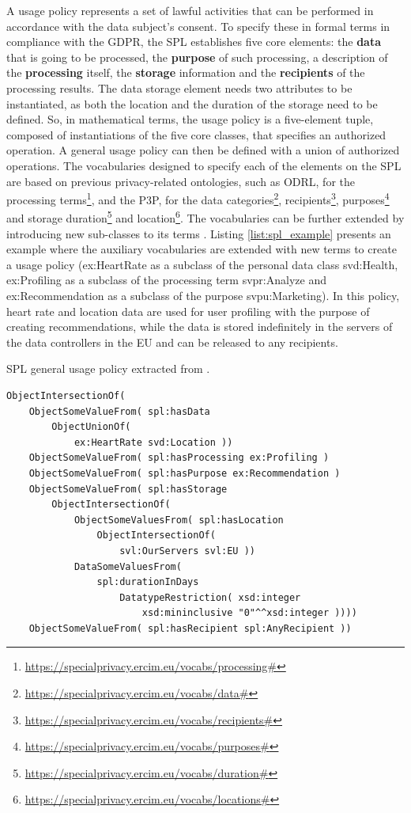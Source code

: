 A usage policy represents a set of lawful activities that can be performed in accordance with the data subject's consent.
To specify these in formal terms in compliance with the GDPR, the SPL establishes five core elements: the \textbf{data} that is going to be processed, the \textbf{purpose} of such processing, a description of the \textbf{processing} itself, the \textbf{storage} information and the \textbf{recipients} of the processing results.
The data storage element needs two attributes to be instantiated, as both the location and the duration of the storage need to be defined.
So, in mathematical terms, the usage policy is a five-element tuple, composed of instantiations of the five core classes, that specifies an authorized operation.
A general usage policy can then be defined with a union of authorized operations.
The vocabularies designed to specify each of the elements on the SPL are based on previous privacy-related ontologies, such as ODRL, for the processing terms\footnote{\url{https://specialprivacy.ercim.eu/vocabs/processing\#}}, and the P3P, for the data categories\footnote{\url{https://specialprivacy.ercim.eu/vocabs/data\#}}, recipients\footnote{\url{https://specialprivacy.ercim.eu/vocabs/recipients\#}}, purposes\footnote{\url{https://specialprivacy.ercim.eu/vocabs/purposes\#}} and storage duration\footnote{\url{https://specialprivacy.ercim.eu/vocabs/duration\#}} and location\footnote{\url{https://specialprivacy.ercim.eu/vocabs/locations\#}}.
The vocabularies can be further extended by introducing new sub-classes to its terms \citep{bonatti_policy_2018}.
Listing \ref{list:spl_example} presents an example where the auxiliary vocabularies are extended with new terms to create a usage policy (ex:HeartRate as a subclass of the personal data class svd:Health, ex:Profiling as a subclass of the processing term svpr:Analyze and ex:Recommendation as a subclass of the purpose svpu:Marketing). In this policy, heart rate and location data are used for user profiling with the purpose of creating recommendations, while the data is stored indefinitely in the servers of the data controllers in the EU and can be released to any recipients.

\begin{listing}
\caption{SPL general usage policy extracted from \cite{bonatti_special_2019}.}
\label{list:spl_example}
\begin{verbatim}
ObjectIntersectionOf(
    ObjectSomeValueFrom( spl:hasData
        ObjectUnionOf(
            ex:HeartRate svd:Location ))
    ObjectSomeValueFrom( spl:hasProcessing ex:Profiling )
    ObjectSomeValueFrom( spl:hasPurpose ex:Recommendation )
    ObjectSomeValueFrom( spl:hasStorage
        ObjectIntersectionOf(
            ObjectSomeValuesFrom( spl:hasLocation
                ObjectIntersectionOf( 
                    svl:OurServers svl:EU ))
            DataSomeValuesFrom(
                spl:durationInDays
                    DatatypeRestriction( xsd:integer
                        xsd:mininclusive "0"^^xsd:integer ))))
    ObjectSomeValueFrom( spl:hasRecipient spl:AnyRecipient ))
\end{verbatim}
\end{listing}

